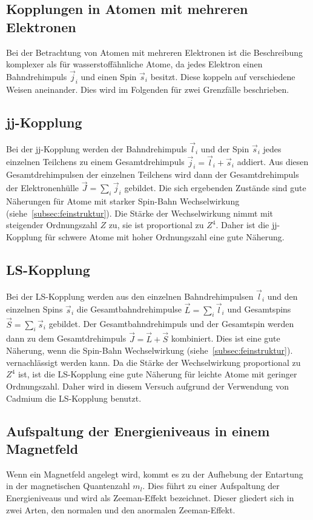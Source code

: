 \subsection{Kopplungen in Atomen mit mehreren Elektronen}
\label{subsec:mehrelektronen}
Bei der Betrachtung von Atomen mit mehreren Elektronen ist die Beschreibung
komplexer als für wasserstoffähnliche Atome, da jedes Elektron einen
Bahndrehimpuls $\vec{j}_{i}$ und einen Spin $\vec{s}_{i}$ besitzt. Diese koppeln
auf verschiedene Weisen aneinander. Dies wird im Folgenden für zwei Grenzfälle
beschrieben.

\subsection*{jj-Kopplung}
Bei der jj-Kopplung werden der Bahndrehimpuls $\vec{l}_{i}$ und der Spin $\vec{s}_{i}$ jedes
einzelnen Teilchens zu einem Gesamtdrehimpuls $\vec{j}_{i} = \vec{l}_{i} + \vec{s}_{i}$ addiert.
Aus diesen Gesamtdrehimpulsen der einzelnen Teilchens wird dann der
Gesamtdrehimpuls der Elektronenhülle $\vec{J} = \sum_{i} \vec{j}_{i}$ gebildet.
Die sich ergebenden Zustände sind gute Näherungen für Atome mit starker
Spin-Bahn Wechselwirkung (siehe~\ref{subsec:feinstruktur}).
Die Stärke der Wechselwirkung nimmt mit steigender Ordnungszahl $Z$ zu, sie
ist proportional zu $Z^{4}$. Daher ist die jj-Kopplung für schwere Atome mit
hoher Ordnungszahl eine gute Näherung.
\subsection*{LS-Kopplung}
Bei der LS-Kopplung werden aus den einzelnen Bahndrehimpulsen $\vec{l}_{i}$ und den
einzelnen Spins $\vec{s}_{i}$ die Gesamtbahndrehimpulse
$\vec{L} = \sum_{i} \vec{l}_{i}$ und Gesamtspins $\vec{S} = \sum_{i} \vec{s}_{i}$ gebildet.
Der Gesamtbahndrehimpuls und der Gesamtspin werden dann zu dem Gesamtdrehimpuls
$\vec{J} = \vec{L} + \vec{S}$ kombiniert.
Dies ist eine gute Näherung, wenn die Spin-Bahn Wechselwirkung
(siehe~\ref{subsec:feinstruktur}).
vernachlässigt werden kann. Da die Stärke der Wechselwirkung proportional zu
$Z^{4}$ ist, ist die LS-Kopplung eine gute Näherung für leichte Atome mit
geringer Ordnungszahl. Daher wird in diesem Versuch aufgrund der Verwendung
von Cadmium die LS-Kopplung benutzt.

\subsection{Aufspaltung der Energieniveaus in einem Magnetfeld}
\label{subsec:aufspaltung}
Wenn ein Magnetfeld angelegt wird, kommt es zu der Aufhebung der Entartung in
der magnetischen Quantenzahl $m_{l}$. Dies führt zu einer Aufspaltung der
Energieniveaus und wird als Zeeman-Effekt bezeichnet. Dieser gliedert sich
in zwei Arten, den normalen und den anormalen Zeeman-Effekt.
